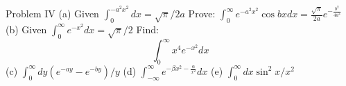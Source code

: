 Problem IV
(a) Given $\int_0^{-a^2 x^2} d x=\sqrt{\pi} / 2 a$
Prove: $\int_0^{\infty} e^{-a^2 x^2} \cos b x d x=\frac{\sqrt{\pi}}{2 a} e^{-\frac{b^2}{4 a^2}}$
(b) Given $\int_0^{\infty} e^{-x^2} d x=\sqrt{\pi} / 2$
Find:
$$
\int_0^{\infty} x^4 e^{-x^2} d x
$$
(c) $\int_0^{\infty} d y\left(e^{-a y}-e^{-b y}\right) / y$
(d) $\int_{-\infty}^{\infty} e^{-\beta x^2-\frac{\alpha}{x^2}} d x$
(e) $\int_0^{\infty} d x \sin ^2 x / x^2$